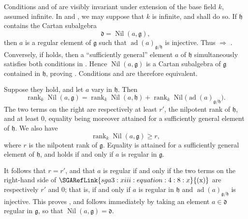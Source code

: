 Conditions  and  of  are visibly invariant under extension
of the base field \(k\), assumed infinite. In  and , we may
suppose that \(k\) is infinite, and shall do so. If \(\mathfrak h\)
contains the Cartan subalgebra
\[
  \mathfrak d=\operatorname{Nil}(a,\mathfrak g),
\]
then \(a\) is a regular element of \(\mathfrak g\) such that
\(\operatorname{ad}(a)_{\mathfrak g/\mathfrak h}\) is injective.
Thus  \(\Rightarrow\) . Conversely, if  holds, then a
``sufficiently general'' element \(a\) of \(\mathfrak h\)
simultaneously satisfies both conditions in . Hence
\(\operatorname{Nil}(a,\mathfrak g)\) is a Cartan subalgebra of
\(\mathfrak g\) contained in \(\mathfrak h\), proving .
Conditions  and  are therefore equivalent.

Suppose they hold, and let \(a\) vary in \(\mathfrak h\). Then
\[
\tag{x}
  \operatorname{rank}_k\operatorname{Nil}(a,\mathfrak g)
  =
  \operatorname{rank}_k\operatorname{Nil}(a,\mathfrak h)
  +
  \operatorname{rank}_k
  \operatorname{Nil}\bigl(
    \operatorname{ad}(a)_{\mathfrak g/\mathfrak h}
  \bigr).
\]
The two terms on the right are respectively at least \(r'\), the
nilpotent rank of \(\mathfrak h\), and at least \(0\), equality
being moreover attained for a sufficiently general
element of \(\mathfrak h\). We also have
\[
  \operatorname{rank}_k\operatorname{Nil}(a,\mathfrak g)\geq r,
\]
where \(r\) is the nilpotent rank of \(\mathfrak g\). Equality is
attained for a sufficiently general element of \(\mathfrak h\), and
holds if and only if \(a\) is regular in \(\mathfrak g\).

It follows that \(r=r'\), and that \(a\) is regular if and only if
the two terms on the right-hand side of \(\SGARefLink{sga3:xiii:equation:4:8:x}{\mathrm{(x)}}\) are
respectively \(r'\) and \(0\); that is, if and only if \(a\) is
regular in \(\mathfrak h\) and
\(\operatorname{ad}(a)_{\mathfrak g/\mathfrak h}\) is injective.
This proves , and  follows immediately by taking an element
\(a\in\mathfrak d\) regular in \(\mathfrak g\), so that
\(\operatorname{Nil}(a,\mathfrak g)=\mathfrak d\).

